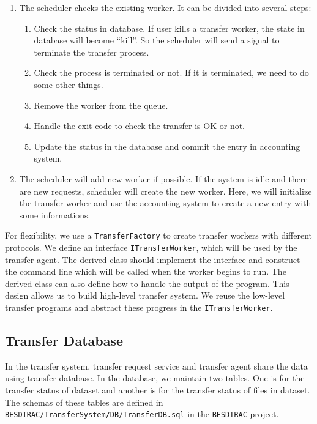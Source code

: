 \begin{enumerate}
\item The scheduler checks the existing worker.
It can be divided into several steps:
\begin{enumerate}
    \item Check the status in database.
          If user kills a transfer worker, the state in
          database will become ``kill''.
          So the scheduler will
          send a signal to terminate the
          transfer process.
    \item Check the process is terminated or not.
          If it is terminated, we need to do some other things.
    \item Remove the worker from the queue.
    \item Handle the exit code to check the transfer is OK or not.
    \item Update the status in the database 
          and commit the entry in accounting system.
\end{enumerate}
\item The scheduler will add new worker if possible.
If the system is idle and there are new requests,
scheduler will create the new worker.
Here, we will initialize the transfer worker and use the accounting
system to create a new entry with some informations.
\end{enumerate}
For flexibility, we use a {\tt TransferFactory} to create transfer workers
with different protocols. 
We define an interface {\tt ITransferWorker},
which will be used by the transfer agent. The derived class should
implement the interface and construct the command line which will 
be called when the worker begins to run.
The derived class can also define how to handle the output of the 
program.
This design allows us to build high-level transfer system.
We reuse the low-level transfer programs and abstract these
progress in the {\tt ITransferWorker}.

\subsection{Transfer Database}

In the transfer system, transfer request service and transfer agent
share the data using transfer database. In the database, we maintain
two tables.
One is for the transfer status of dataset 
and another is for the transfer status of files in dataset. 
The schemas of these tables are defined 
in {\tt BESDIRAC/TransferSystem/DB/TransferDB.sql} in the {\tt BESDIRAC}
project\cite{bib:besdirac}.
